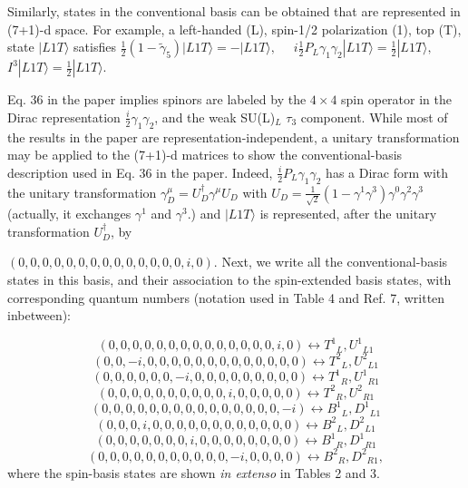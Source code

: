 \documentclass[12pt]{article}
\renewcommand\[{\begin{dmath}}
\renewcommand\]{\end{dmath}}
\begin{document}
Similarly, states in the conventional basis can be obtained that are    represented in (7+1)-d space.
For example,    a left-handed (L),  spin-1/2 polarization (1),   top (T),     state
$ |  L 1  T   \rangle $ satisfies
$\frac{1}{2}(1-\tilde \gamma_5)| L 1 T\rangle = -| L 1 T\rangle  , $  \  \
$ i\frac{1}{2}P_L \gamma_1\gamma_2| L 1 T\rangle  =\frac{1}{2}| L 1 T\rangle, $ \ \
$ I^3| L 1 T\rangle =\frac{1}{2} | L 1 T\rangle $.


Eq. 36 in the paper implies spinors are labeled by the $4\times 4$  spin  operator in the Dirac representation $ \frac{i}{2} \gamma_1\gamma_2 $, and
    the weak SU(L)$_L$ $\tau_3$ component. While most of the results in the paper are representation-independent, a unitary transformation may be applied to the (7+1)-d matrices to show the conventional-basis
description used in Eq. 36 in the paper. Indeed, $    \frac{i}{2}P_L \gamma_1\gamma_2$ has a Dirac   form with the unitary transformation
$\gamma ^\mu_D=U_D^\dagger  \gamma^ \mu   U_D$ with $U_D= \frac{1}{\sqrt{2}}(1-\gamma^1\gamma^3) \gamma^0  \gamma^2 \gamma^ 3 $ (actually, it exchanges $\gamma^1$ and $\gamma^3$.)
and  $ |  L 1 T\rangle $ is represented, after the unitary transformation $U_D^\dagger$,  by

\noindent $ (0, 0, 0, 0, 0, 0, 0, 0, 0, 0, 0, 0, 0, 0, i, 0).$
Next, we write  all the  conventional-basis states  in this basis, and their association to the spin-extended basis states, with corresponding    quantum numbers (notation used  in Table 4 and Ref. 7, written inbetween):

 \[ (0, 0, 0, 0, 0, 0, 0, 0, 0, 0, 0, 0, 0, 0, i, 0) \leftrightarrow T  ^1{}_{ { L}},U  ^1{}_{ { L} 1}  \]
  \[ \nonumber (0, 0, -i, 0, 0, 0, 0, 0, 0, 0, 0, 0, 0, 0, 0, 0) \leftrightarrow T  ^2{}_{ { L}} , U  ^2{}_{ { L} 1}   \]
 \[  (0, 0, 0, 0, 0, 0, -i, 0, 0, 0, 0, 0, 0, 0, 0, 0) \leftrightarrow T  ^1{}_{ { R}} , U  ^1{}_{ { R} 1}  \]
  \[ \nonumber (0, 0, 0, 0, 0, 0, 0, 0, 0, 0, i, 0, 0, 0, 0, 0) \leftrightarrow T  ^2{}_{ { R}} ,U  ^2{}_{ { R} 1}  \]
  \[ \nonumber  ({0, 0, 0, 0, 0, 0, 0, 0, 0, 0, 0, 0, 0, 0, 0, -i}) \leftrightarrow B  ^1{}_{ { L}},D  ^1{}_{ { L} 1}  \]
 \[  (0, 0, 0, i, 0, 0, 0, 0, 0, 0, 0, 0, 0, 0, 0, 0) \leftrightarrow B  ^2{}_{ { L}}, D  ^2{}_{ { L} 1}  \]
  \[ \nonumber ({ 0, 0, 0, 0, 0, 0, 0, i, 0, 0, 0, 0, 0, 0, 0, 0}) \leftrightarrow B  ^1{}_{ { R}} , D  ^1{}_{ { R} 1}  \]
   \[  (0, 0, 0, 0, 0, 0, 0, 0, 0, 0, 0, -i, 0, 0, 0, 0) \leftrightarrow B  ^2{}_{ { R}} , D  ^2{}_{ { R} 1},   \]
where the spin-basis states are shown {\it in
extenso} in Tables 2 and 3.
\end{document}
